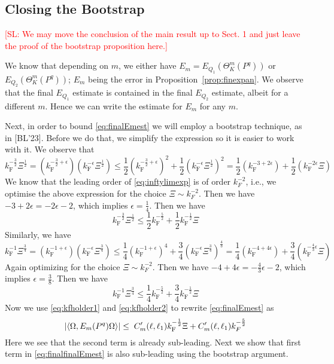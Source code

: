 \documentclass[12pt,a4paper]{article}
\numberwithin{equation}{section}
\newcommand{\1}{\mathbb{I}}
\newcommand{\F}{\mathrm{F}}
\newcommand{\half}{\frac{1}{2}}
\newcommand{\eva}[1]{\left\langle #1 \right\rangle}
\theoremstyle{plain}
\theoremstyle{definition}
\theoremstyle{remark}
\theoremstyle{plain}
\theoremstyle{definition}
\theoremstyle{remark}
\begin{document}
\subsection{Closing the Bootstrap}

\textcolor{red}{[SL: We may move the conclusion of the main result up to Sect. 1 and just leave the proof of the bootstrap proposition here.]}



We know that depending on $m$, we either have $E_m = E_{Q_1}(\Theta^m_K(P^q))$ or $E_{Q_2}(\Theta^m_K(P^q))$; $E_m$ being the error in Proposition~\ref{prop:finexpan}. We observe that the final $E_{Q_1}$ estimate is contained in the final $E_{Q_2}$ estimate, albeit for a different $m$. Hence we can write the estimate for $E_m$ for any $m$. 



Next, in order to bound \eqref{eq:finalEmest} we will employ a bootstrap technique, as in [BL'23]. Before we do that, we simplify the expression so it is easier to work with it.
We observe that 
\begin{equation}
	k_{\F}^{-\frac{3}{2}} \Xi^\half = (k_{\F}^{-\frac{3}{2} +\epsilon} ) (k_{\F}^{-\epsilon} \Xi^\half) \leq \half(k_{\F}^{-\frac{3}{2} +\epsilon} )^2 + \half(k_{\F}^{-\epsilon} \Xi^\half)^2 = \half(k_{\F}^{-3 +2\epsilon}) + \half(k_{\F}^{-2\epsilon} \Xi)
\end{equation}
We know that the leading order of \eqref{eq:inftylimexp} is of order $k_F^{-2}$, i.e., we optimise the above expression for the choice $\Xi \sim k_F^{-2}$. Then we have $-3 +2\epsilon = -2\epsilon -2 $, which implies $\epsilon =\frac{1}{4}$. 
Then we have  
\begin{equation} \label{eq:kfholder1}
	k_{\F}^{-\frac{3}{2}} \Xi^\half \leq \half k_{\F}^{-\frac{5}{2}} + \half k_{\F}^{-\half} \Xi
\end{equation}
Similarly, we have
\begin{equation}
	k_{\F}^{-1} \Xi^{\frac{3}{4}} = (k_{\F}^{-1 +\epsilon} ) (k_{\F}^{-\epsilon} \Xi^{\frac{3}{4}}) \leq \frac{1}{4}(k_{\F}^{-1 +\epsilon} )^4 + \frac{3}{4}(k_{\F}^{-\epsilon} \Xi^{\frac{3}{4}})^\frac{4}{3} = \frac{1}{4}(k_{\F}^{-4 +4\epsilon}) + \frac{3}{4}(k_{\F}^{-\frac{4}{3}\epsilon} \Xi)
\end{equation}
Again optimizing for the choice $\Xi \sim k_F^{-2}$. Then we have $-4 +4\epsilon = -\frac{4}{3}\epsilon -2 $, which implies $\epsilon =\frac{3}{8}$. Then we have
\begin{equation} \label{eq:kfholder2}
	k_{\F}^{-1} \Xi^{\frac{3}{4}} \leq \frac{1}{4} k_{\F}^{-\frac{5}{2}} + \frac{3}{4} k_{\F}^{-\half} \Xi
\end{equation}
Now we use \eqref{eq:kfholder1} and \eqref{eq:kfholder2} to rewrite \eqref{eq:finalEmest} as
\begin{equation}
		\abs{\eva{\Omega, E_m(P^q) \Omega}} \leq \; C'_m(\ell,\ell_1) k_{\F}^{-\half}\Xi + C'_m(\ell,\ell_1)k_F^{-\frac{5}{2}} \label{eq:finalfinalEmest}
\end{equation}
Here we see that the second term is already sub-leading.
Next we show that first term in \eqref{eq:finalfinalEmest} is also sub-leading using the bootstrap argument.
\end{document}
